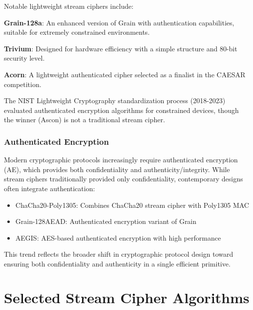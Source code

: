 \documentclass[12pt,a4paper,oneside]{report}
\begin{document}
Notable lightweight stream ciphers include:

\textbf{Grain-128a}: An enhanced version of Grain with authentication capabilities, suitable for extremely constrained environments.

\textbf{Trivium}: Designed for hardware efficiency with a simple structure and 80-bit security level.

\textbf{Acorn}: A lightweight authenticated cipher selected as a finalist in the CAESAR competition.

The NIST Lightweight Cryptography standardization process (2018-2023) evaluated authenticated encryption algorithms for constrained devices, though the winner (Ascon) is not a traditional stream cipher.

\subsection{Authenticated Encryption}

Modern cryptographic protocols increasingly require authenticated encryption (AE), which provides both confidentiality and authenticity/integrity. While stream ciphers traditionally provided only confidentiality, contemporary designs often integrate authentication:

\begin{itemize}
    \item ChaCha20-Poly1305: Combines ChaCha20 stream cipher with Poly1305 MAC
    \item Grain-128AEAD: Authenticated encryption variant of Grain
    \item AEGIS: AES-based authenticated encryption with high performance
\end{itemize}

This trend reflects the broader shift in cryptographic protocol design toward ensuring both confidentiality and authenticity in a single efficient primitive.


\chapter{Selected Stream Cipher Algorithms}
\label{ch:algorithms}
\end{document}
